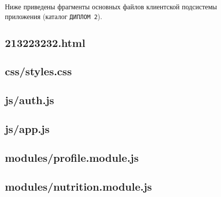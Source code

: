 
Ниже приведены фрагменты основных файлов клиентской подсистемы приложения (каталог \texttt{ДИПЛОМ 2}).

\subsection*{213223232.html}



\subsection*{css/styles.css}



\subsection*{js/auth.js}







\subsection*{js/app.js}





\subsection*{modules/profile.module.js}



\subsection*{modules/nutrition.module.js}

